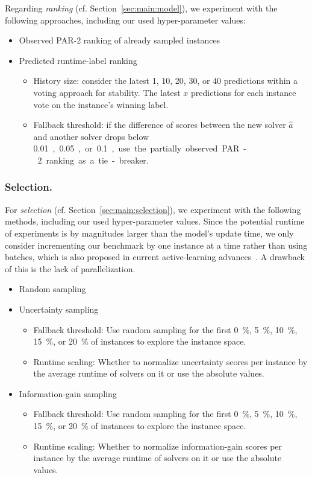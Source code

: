 \documentclass[runningheads]{llncs}
\begin{document}
Regarding \emph{ranking} (cf. Section~\ref{sec:main:model}), we experiment with the following approaches, including our used hyper-parameter values:

\begin{itemize}
  \item Observed PAR-2 ranking of already sampled instances
  \item Predicted runtime-label ranking
  \begin{itemize}
    \item
    History size: consider the latest 1, 10, 20, 30, or 40 predictions within a voting approach for stability.
    The latest $x$ predictions for each instance vote on the instance's winning label.
    \item
    Fallback threshold: if the difference of scores between the new solver $\hat{a}$ and another solver drops below \SI{0.01}, \SI{0.05}, or \SI{0.1}, use the partially observed PAR-2 ranking as a tie-breaker.
  \end{itemize}
\end{itemize}

\subsubsection{Selection.}

For \emph{selection} (cf. Section~\ref{sec:main:selection}), we experiment with the following methods, including our used hyper-parameter values.
Since the potential runtime of experiments is by magnitudes larger than the model's update time, we only consider incrementing our benchmark by one instance at a time rather than using batches, which is also proposed in current active-learning advances~\cite{SinhaED19,2019gaal}.
A drawback of this is the lack of parallelization.

\begin{itemize}
  \item Random sampling 
  \item Uncertainty sampling
  \begin{itemize}
    \item Fallback threshold: Use random sampling for the first \SI{0}{\%}, \SI{5}{\%}, \SI{10}{\%}, \SI{15}{\%}, or \SI{20}{\%} of instances to explore the instance space.
    \item Runtime scaling: Whether to normalize uncertainty scores per instance by the average runtime of solvers on it or use the absolute values.
  \end{itemize}

  \item Information-gain sampling
  \begin{itemize}
    \item Fallback threshold: Use random sampling for the first \SI{0}{\%}, \SI{5}{\%}, \SI{10}{\%}, \SI{15}{\%}, or \SI{20}{\%} of instances to explore the instance space.
    \item Runtime scaling: Whether to normalize information-gain scores per instance by the average runtime of solvers on it or use the absolute values.
  \end{itemize}
\end{itemize}
\end{document}
